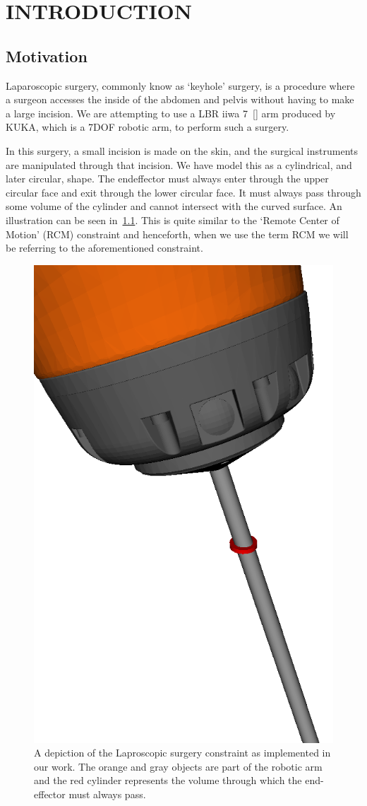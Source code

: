 \documentclass[BTech]{iitmdiss}
\begin{document}


    \chapter{INTRODUCTION}\label{ch:intro}


    \section{Motivation}\label{sec:motiv}
    Laparoscopic surgery, commonly know as `keyhole' surgery, is a procedure where a surgeon accesses the inside of
    the abdomen and pelvis without having to make a large incision.
    We are attempting to use a LBR iiwa 7~[\cite{AG}] arm produced by KUKA, which is a 7DOF robotic arm, to perform such a surgery.

    In this surgery, a small incision is made on the skin, and the surgical instruments are manipulated through that incision.
    We have model this as a cylindrical, and later circular, shape.
    The endeffector must always enter through the upper circular face and exit through the lower circular face.
    It must always pass through some volume of the cylinder and cannot intersect with the curved surface.
    An illustration can be seen in~\ref{fig:RCM}.
    This is quite similar to the `Remote Center of Motion' (RCM) constraint and henceforth, when we use the term RCM we will be referring to the aforementioned constraint.

    \begin{figure}
        \centering
        \includegraphics[height= 0.5\textwidth]{./img/rcm-constraint}
        \caption{A depiction of the Laproscopic surgery constraint as implemented in our work. The orange and gray objects are part of the robotic arm and the red cylinder represents the volume through which the end-effector must always pass.}
        \label{fig:RCM}
    \end{figure}
\end{document}
